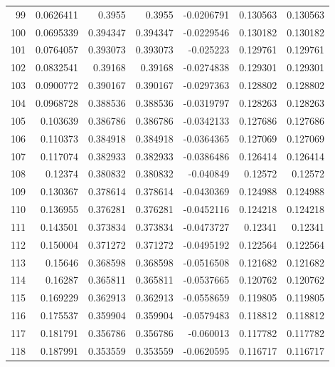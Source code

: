 \begin{tabular}{rrrrrrr}
  99 &  0.0626411   & 0.3955      & 0.3955      & -0.0206791   & 0.130563    & 0.130563    \\
 100 &  0.0695339   & 0.394347    & 0.394347    & -0.0229546   & 0.130182    & 0.130182    \\
 101 &  0.0764057   & 0.393073    & 0.393073    & -0.025223    & 0.129761    & 0.129761    \\
 102 &  0.0832541   & 0.39168     & 0.39168     & -0.0274838   & 0.129301    & 0.129301    \\
 103 &  0.0900772   & 0.390167    & 0.390167    & -0.0297363   & 0.128802    & 0.128802    \\
 104 &  0.0968728   & 0.388536    & 0.388536    & -0.0319797   & 0.128263    & 0.128263    \\
 105 &  0.103639    & 0.386786    & 0.386786    & -0.0342133   & 0.127686    & 0.127686    \\
 106 &  0.110373    & 0.384918    & 0.384918    & -0.0364365   & 0.127069    & 0.127069    \\
 107 &  0.117074    & 0.382933    & 0.382933    & -0.0386486   & 0.126414    & 0.126414    \\
 108 &  0.12374     & 0.380832    & 0.380832    & -0.040849    & 0.12572     & 0.12572     \\
 109 &  0.130367    & 0.378614    & 0.378614    & -0.0430369   & 0.124988    & 0.124988    \\
 110 &  0.136955    & 0.376281    & 0.376281    & -0.0452116   & 0.124218    & 0.124218    \\
 111 &  0.143501    & 0.373834    & 0.373834    & -0.0473727   & 0.12341     & 0.12341     \\
 112 &  0.150004    & 0.371272    & 0.371272    & -0.0495192   & 0.122564    & 0.122564    \\
 113 &  0.15646     & 0.368598    & 0.368598    & -0.0516508   & 0.121682    & 0.121682    \\
 114 &  0.16287     & 0.365811    & 0.365811    & -0.0537665   & 0.120762    & 0.120762    \\
 115 &  0.169229    & 0.362913    & 0.362913    & -0.0558659   & 0.119805    & 0.119805    \\
 116 &  0.175537    & 0.359904    & 0.359904    & -0.0579483   & 0.118812    & 0.118812    \\
 117 &  0.181791    & 0.356786    & 0.356786    & -0.060013    & 0.117782    & 0.117782    \\
 118 &  0.187991    & 0.353559    & 0.353559    & -0.0620595   & 0.116717    & 0.116717    \\

\end{tabular}
